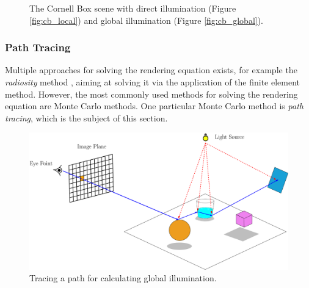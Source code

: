 \begin{figure}
	\centering
	\hfill
	\caption{The Cornell Box scene with direct illumination (Figure \ref{fig:cb_local}) and global illumination (Figure \ref{fig:cb_global}).}
\end{figure}



\subsubsection{Path Tracing}

Multiple approaches for solving the rendering equation exists, for example the \emph{radiosity} method \cite{goral1984modeling}, aiming at solving it via the application of the finite element method. However, the most commonly used methods for solving the rendering equation are Monte Carlo methods. One particular Monte Carlo method is \emph{path tracing}, which is the subject of this section.

\begin{figure}
	\centering
	\includegraphics[width=1\linewidth]{img/1 fundamentals/path_tracing.png}
	\caption{Tracing a path for calculating global illumination.}
	\label{fig:pathtracing}
\end{figure}


